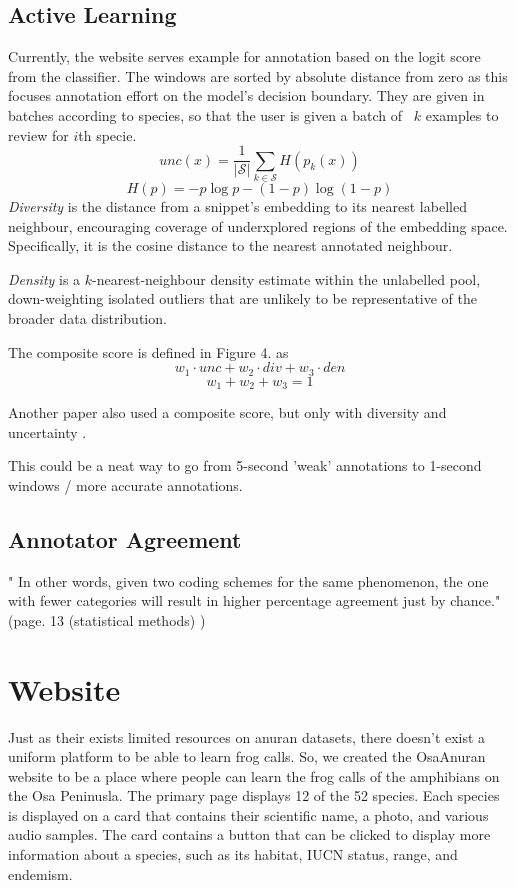 \documentclass{article}
\begin{document}
\subsection{Active Learning}
Currently, the website serves example for annotation based on the logit score from the classifier. The windows are sorted by absolute distance from zero as this focuses annotation effort on the model's decision boundary. They are given in batches according to species, so that the user is given a batch of ~$k$ examples to review for $i$th specie. 
\[ unc(x) = \frac{1}{|\mathscr{S}|} \sum_{k \in \mathscr{S}} H(p_k(x)) \]
\[H(p) = -p\log p - (1-p)\log(1-p)\]
\textit{Diversity} is the distance from a snippet's embedding to its nearest labelled neighbour, encouraging coverage of underxplored regions of the embedding space. Specifically, it is the cosine distance to the nearest annotated neighbour. 

\textit{Density} is a $k$-nearest-neighbour density estimate within the unlabelled pool, down-weighting isolated outliers that are unlikely to be representative of the broader data distribution.\cite{gouveaYAPATOpenSourcePlatform2026} \cite{settlesActiveLearningLiterature, heActiveLearningApproach2014}


The composite score is defined in Figure 4. as 
\[w_1 \cdot unc + w_2 \cdot div + w_3 \cdot den\]
\[w_1 + w_2 + w_3 = 1\]

Another paper also used a composite score, but only with diversity and uncertainty \cite{kathLeveragingTransferLearning2024}. 


\cite{lindholmAggregationStrategiesEfficient2025} This could be a neat way to go from 5-second 'weak' annotations to 1-second windows / more accurate annotations. 

\subsection{Annotator Agreement}
" In other words,
given two coding schemes for the same phenomenon, the one with fewer categories will result
in higher percentage agreement just by chance." (page. 13 (statistical methods) \cite{artsteinInterCoderAgreementComputational2008})


\section{Website}
Just as their exists limited resources on anuran datasets, there doesn't exist a uniform platform to be able to learn frog calls. So, we created the OsaAnuran website to be a place where people can learn the frog calls of the amphibians on the Osa Peninusla. The primary page displays 12 of the 52 species. Each species is displayed on a card that contains their scientific name, a photo, and various audio samples. The card contains a button that can be clicked to display more information about a species, such as its habitat, IUCN status, range, and endemism. 
\end{document}

